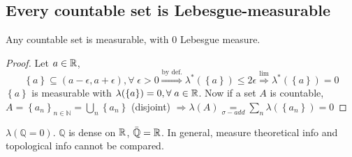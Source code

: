 \subsection{Every countable set is Lebesgue-measurable}
\begin{proposition}
    Any countable set is measurable, with \(0\) Lebesgue measure.
\end{proposition}
\begin{proof}
    Let \(a \in \mathbb{R}\), \[\left\lbrace a \right\rbrace \subseteq (a-\epsilon, a+\epsilon), \forall \; \epsilon > 0 \overset{\mbox{by def.}}{\Rightarrow} \lambda^*(\left\lbrace a \right\rbrace) \leq 2\epsilon \overset{\mbox{lim}}{\Rightarrow} \lambda^*(\left\lbrace a \right\rbrace) = 0\]
    \(\left\lbrace a \right\rbrace\) is measurable with \(\lambda(\left\lbrace a \right\rbrace) = 0, \forall \; a \in \mathbb{R}\). Now if a set \(A\) is countable, \(A = \left\lbrace a_n \right\rbrace_{n \in \mathbb{N}} = \bigcup_n \left\lbrace a_n \right\rbrace\) (disjoint) \(\Rightarrow \lambda(A) \underset{\sigma-add}{=} \sum_n \lambda(\left\lbrace a_n \right\rbrace) = 0\)
\end{proof}
\begin{remark}
    \(\lambda(\mathbb{Q} = 0)\). \(\mathbb{Q}\) is dense on \(\mathbb{R}\), \(\bar{\mathbb{Q}} = \mathbb{R}\). In general, measure theoretical info and topological info cannot be compared.
\end{remark}
